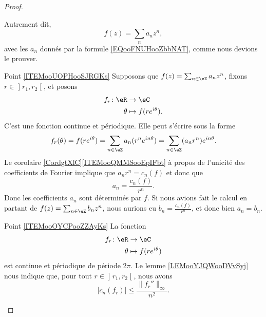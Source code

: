 \begin{proof}
\begin{subproof}
        Autrement dit,
        \begin{equation}
            f(z)=\sum_na_nz^n,
        \end{equation}
        avec les \( a_n\) donnés par la formule \eqref{EQooFNUHooZbbNAT}, comme nous devions le prouver.
    \item[Point \ref{ITEMooUOPHooSJRGKs}]
    Supposons que \( f(z)=\sum_{n\in \eZ}a_nz^n\), fixons \( r\in \mathopen] r_1 , r_2 \mathclose[\), et posons
        \begin{equation}
            \begin{aligned}
                f_r\colon \eR&\to \eC \\
                \theta&\mapsto f(r e^{i\theta}). 
            \end{aligned}
        \end{equation}
        C'est une fonction continue et périodique. Elle peut s'écrire sous la forme
        \begin{equation}
            f_r(\theta)=f(r e^{i\theta})=\sum_{n\in \eZ}a_n(r^n e^{in\theta})=\sum_{n\in \eZ}(a_nr^n) e^{in\theta}.
        \end{equation}
        Le corolaire \ref{CordgtXlC}\ref{ITEMooQMMSooEpIFbt} à propos de l'unicité des coefficients de Fourier implique que \( a_nr^n=c_n(f)\) et donc que
        \begin{equation}        \label{EQooBNSMooGLIBqU}
            a_n=\frac{ c_n(f) }{ r^n }.
        \end{equation}
        Donc les coefficients \( a_n\) sont déterminés par \( f\). Si nous avions fait le calcul en partant de \( f(z)=\sum_{n\in \eZ}b_nz^n\), nous aurions eu \( b_n=\frac{ c_n(f) }{ r^n }\), et donc bien \( a_n=b_n\).
    \item[Point \ref{ITEMooOYCPooZZAyKs}]
        La fonction
        \begin{equation}
            \begin{aligned}
                f_r\colon \eR&\to \eC \\
                \theta&\mapsto f(r e^{i\theta}) 
            \end{aligned}
        \end{equation}
    est continue et périodique de période \( 2\pi\). Le lemme \ref{LEMooYJQWooDVvSyj} nous indique que, pour tout \( r\in \mathopen] r_1 , r_2 \mathclose[\), nous avons
        \begin{equation}        \label{EQooMDNNooPYFQrq}
            | c_n(f_r) |\leq \frac{ \| f_r'' \|_{\infty} }{ n^2 }.

\end{equation}
\end{subproof}
\end{proof}
